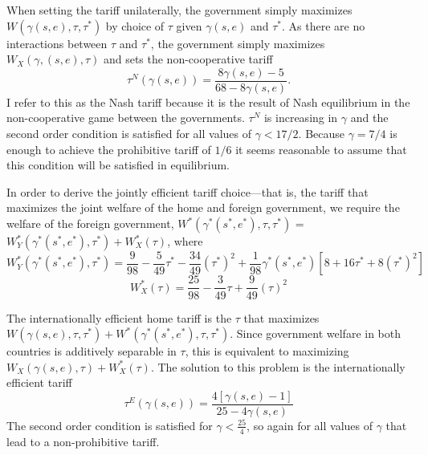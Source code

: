 \documentclass[12pt]{article}
\newcommand{\ve}{\theta}
\newcommand{\ga}{\gamma}
\begin{document}
When setting the tariff unilaterally, the government simply maximizes $W(\ga(s,e),\tau, \tau^*)$ by choice of $\tau$ given $\ga(s,e)$ and $\tau^*$. As there are no interactions between $\tau$ and $\tau^*$, the government simply maximizes $W_X(\ga,(s,e),\tau)$ and sets the non-cooperative tariff
\begin{equation}
  \tau^N(\ga(s,e)) = \frac{8\ga(s,e)-5}{68-8\ga(s,e)}.
  \label{eq:nash}
\end{equation}
I refer to this as the Nash tariff because it is the result of Nash equilibrium in the non-cooperative game between the governments. $\tau^N$ is increasing in $\ga$ and the second order condition is satisfied for all values of $\ga < 17/2$. Because $\ga = 7/4$ is enough to achieve the prohibitive tariff of $1/6$ it seems reasonable to assume that this condition will be satisfied in equilibrium. 

In order to derive the jointly efficient tariff choice---that is, the tariff that maximizes the joint welfare of the home and foreign government, we require the welfare of the foreign government, $W^*(\ga^*(s^*,e^*),\tau,\tau^*)$ = $W_Y^*(\ga^*(s^*,e^*),\tau^*) + W_X^*(\tau)$, where
\[
  W_Y^*(\ga^*(s^*,e^*),\tau^*) = \frac{9}{98} - \frac{5}{49}\tau^* - \frac{34}{49}(\tau^*)^2 +\frac{1}{98}\ga^*(s^*,e^*)\left[ 8 + 16\tau^* + 8(\tau^*)^2 \right]
\]
\[
  W_X^*(\tau) = \frac{25}{98} - \frac{3}{49}\tau + \frac{9}{49}(\tau)^2 
\]

The internationally efficient home tariff is the $\tau$ that maximizes $W(\ga(s,e),\tau,\tau^*) + W^*(\ga^*(s^*,e^*),\tau,\tau^*)$. Since government welfare in both countries is additively separable in $\tau$, this is equivalent to maximizing $W_X(\ga(s,e),\tau) + W_X^*(\tau)$. The solution to this problem is the internationally efficient tariff
\begin{equation}
  \tau^E(\ga(s,e)) = \frac{4\left[\ga(s,e)-1\right]}{25-4\ga(s,e)}
  \label{eq:eff}
\end{equation}
The second order condition is satisfied for $\ga < \frac{25}{4}$, so again for all values of $\ga$ that lead to a non-prohibitive tariff.

\end{document}
